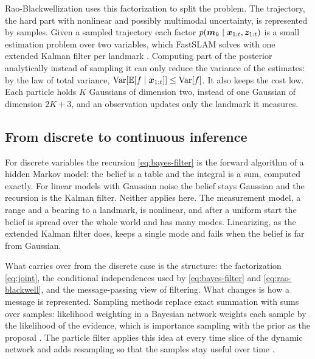 Rao-Blackwellization \cite{doucet2000rao} uses this factorization to split the problem. The trajectory, the hard
part with nonlinear and possibly multimodal uncertainty, is represented by samples. Given a sampled trajectory each
factor $p(\bm{m}_k \mid \bm{x}_{1:t}, \bm{z}_{1:t})$ is a small estimation problem over two variables, which FastSLAM solves with
one extended Kalman filter per landmark \cite{montemerlo2002fastslam}. Computing part of the posterior analytically
instead of sampling it can only reduce the variance of the estimates: by the law of total variance,
$\operatorname{Var}[\mathbb{E}[f \mid \bm{x}_{1:t}]] \le \operatorname{Var}[f]$. It also keeps the cost low. Each
particle holds $K$ Gaussians of dimension two, instead of one Gaussian of dimension $2K + 3$, and an observation
updates only the landmark it measures.

\subsection{From discrete to continuous inference}

For discrete variables the recursion \eqref{eq:bayes-filter} is the forward algorithm of a hidden Markov model: the
belief is a table and the integral is a sum, computed exactly. For linear models with Gaussian noise the belief
stays Gaussian and the recursion is the Kalman filter. Neither applies here. The measurement model, a range and a
bearing to a landmark, is nonlinear, and after a uniform start the belief is spread over the whole world and has
many modes. Linearizing, as the extended Kalman filter does, keeps a single mode and fails when the belief is far
from Gaussian.

What carries over from the discrete case is the structure: the factorization \eqref{eq:joint}, the conditional
independences used by \eqref{eq:bayes-filter} and \eqref{eq:rao-blackwell}, and the message-passing view of
filtering. What changes is how a message is represented. Sampling methods replace exact summation with sums over
samples: likelihood weighting in a Bayesian network weights each sample by the likelihood of the evidence, which is
importance sampling with the prior as the proposal \cite[ch.~12]{koller2009probabilistic}. The particle filter
applies this idea at every time slice of the dynamic network and adds resampling so that the samples stay useful
over time \cite[ch.~15]{koller2009probabilistic}.
